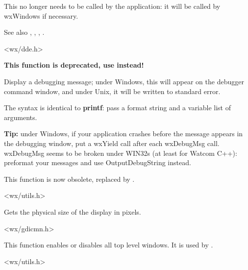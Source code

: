 This no longer needs to be called by the application: it will be called
by wxWindows if necessary.

See also , , , 
.


<wx/dde.h>

\label{wxdebugmsg}


{\bf This function is deprecated, use  instead!}

Display a debugging message; under Windows, this will appear on the
debugger command window, and under Unix, it will be written to standard
error.

The syntax is identical to {\bf printf}: pass a format string and a
variable list of arguments.

{\bf Tip:} under Windows, if your application crashes before the
message appears in the debugging window, put a wxYield call after
each wxDebugMsg call. wxDebugMsg seems to be broken under WIN32s
(at least for Watcom C++): preformat your messages and use OutputDebugString
instead.

This function is now obsolete, replaced by .


<wx/utils.h>



Gets the physical size of the display in pixels.


<wx/gdicmn.h>

\label{wxenabletoplevelwindows}


This function enables or disables all top level windows. It is used by 
.


<wx/utils.h>

\label{wxentry}

